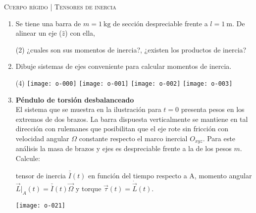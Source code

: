\documentclass[11pt, spanish, a4paper, twoside]{article}
\begin{document}
\begin{center}
  \textsc{\large Cuerpo rígido | Tensores de inercia}
\end{center}


\begin{enumerate}



	\item Se tiene una barra de \(m= \SI{1}{\kilo\gram}\) de sección despreciable frente a \(l= \SI{1}{\metre}\).
		De alinear un eje (\(\hat{z}\)) con ella, 
		\begin{tasks}(2)
			\task	¿cuales son sus momentos de inercia?,
			\task ¿existen los productos de inercia? 
		\end{tasks}


	\item
		Dibuje sistemas de ejes conveniente para calcular momentos de inercia.
		\vspace{-1.1cm}
		\begin{tasks}(4)
			\task \texttt{[image: o-000]}
			\task \texttt{[image: o-001]}
			\task \texttt{[image: o-002]}
			\task \texttt{[image: o-003]}
		\end{tasks}



	\item 
		\begin{minipage}[t][4.5cm]{0.7\textwidth}
			\textbf{Péndulo de torsión desbalanceado}\\
			El sistema que se muestra en la ilustración para \(t=0\) presenta pesos en los extremos de dos brazos.
			La barra dispuesta verticalmente se mantiene en tal dirección con rulemanes que posibilitan que el eje rote sin fricción con velocidad angular $\Omega$ constante respecto el marco inercial $O_{xyz}$.
			Para este análisis la masa de brazos y ejes es despreciable frente a la de los pesos \(m\).
			Calcule: 
			\begin{tasks} 
				\task tensor de inercia \(\overline{\overline{I}}(t)\) en función del tiempo respecto a A,
				\task momento angular $\vec{L}\bigg\rvert_A (t) = \overline{\overline{I}} (t) \vec{\Omega}$ y torque $\vec{\tau} (t) = \dot{\vec{L}} (t)$.
			\end{tasks}
		\end{minipage}
		\begin{minipage}[c][0cm][t]{0.25\textwidth}
			\texttt{[image: o-021]}
		\end{minipage}



\end{enumerate}
\end{document}
